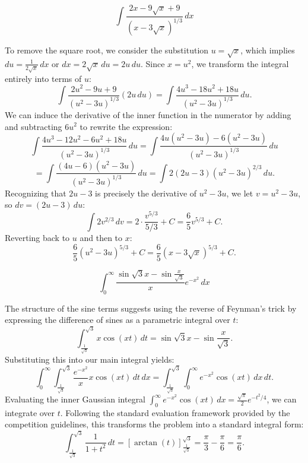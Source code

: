 \begin{questions}
    \question
    \[ \int \frac{2x-9\sqrt{x}+9}{(x-3\sqrt{x})^{1/3}} \, dx \]

    \begin{solution}
    To remove the square root, we consider the substitution $u=\sqrt{x}$, which implies $du = \frac{1}{2\sqrt{x}} \, dx$ or $dx = 2\sqrt{x} \, du = 2u \, du$. Since $x=u^{2}$, we transform the integral entirely into terms of $u$:
    \[ \int \frac{2u^{2}-9u+9}{(u^{2}-3u)^{1/3}} (2u \, du) = \int \frac{4u^{3}-18u^{2}+18u}{(u^{2}-3u)^{1/3}} \, du. \]
    We can induce the derivative of the inner function in the numerator by adding and subtracting $6u^{2}$ to rewrite the expression:
    \[ \int \frac{4u^{3}-12u^{2}-6u^{2}+18u}{(u^{2}-3u)^{1/3}} \, du = \int \frac{4u(u^{2}-3u)-6(u^{2}-3u)}{(u^{2}-3u)^{1/3}} \, du \]
    \[ = \int \frac{(4u-6)(u^{2}-3u)}{(u^{2}-3u)^{1/3}} \, du = \int 2(2u-3)(u^{2}-3u)^{2/3} \, du. \]
    Recognizing that $2u-3$ is precisely the derivative of $u^{2}-3u$, we let $v=u^{2}-3u$, so $dv = (2u-3) \, du$:
    \[ \int 2v^{2/3} \, dv = 2 \cdot \frac{v^{5/3}}{5/3} + C = \frac{6}{5}v^{5/3} + C. \]
    Reverting back to $u$ and then to $x$:
    \[ \frac{6}{5}(u^{2}-3u)^{5/3} + C = \frac{6}{5}(x-3\sqrt{x})^{5/3} + C. \]
    \end{solution}

    \question
    \[ \int_{0}^{\infty} \frac{\sin\sqrt{3}x-\sin\frac{x}{\sqrt{3}}}{x}e^{-x^{2}} \, dx \]

    \begin{solution}
    The structure of the sine terms suggests using the reverse of Feynman's trick by expressing the difference of sines as a parametric integral over $t$:
    \[ \int_{\frac{1}{\sqrt{3}}}^{\sqrt{3}} x \cos(xt) \, dt = \sin\sqrt{3}x - \sin\frac{x}{\sqrt{3}}. \]
    Substituting this into our main integral yields:
    \[ \int_{0}^{\infty} \int_{\frac{1}{\sqrt{3}}}^{\sqrt{3}} \frac{e^{-x^2}}{x} x \cos(xt) \, dt \, dx = \int_{\frac{1}{\sqrt{3}}}^{\sqrt{3}} \int_{0}^{\infty} e^{-x^2} \cos(xt) \, dx \, dt. \]
    Evaluating the inner Gaussian integral $\int_{0}^{\infty} e^{-x^2} \cos(xt) \, dx = \frac{\sqrt{\pi}}{2}e^{-t^2/4}$, we can integrate over $t$. Following the standard evaluation framework provided by the competition guidelines, this transforms the problem into a standard integral form:
    \[ \int_{\frac{1}{\sqrt{3}}}^{\sqrt{3}} \frac{1}{1+t^2} \, dt = \left[\arctan(t)\right]_{\frac{1}{\sqrt{3}}}^{\sqrt{3}} = \frac{\pi}{3} - \frac{\pi}{6} = \frac{\pi}{6}. \]
    \end{solution}


\end{questions}
